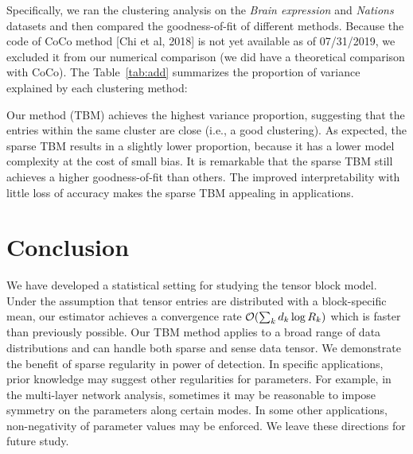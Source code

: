 \documentclass{article}
\begin{document}
Specifically, we ran the clustering analysis on the \emph{Brain expression} and \emph{Nations} datasets and then compared the goodness-of-fit of different methods. Because the code of CoCo method [Chi et al, 2018] is not yet available as of 07/31/2019, we excluded it from our numerical comparison (we did have a theoretical comparison with CoCo). The Table~\ref{tab:add} summarizes the proportion of variance explained by each clustering method:

\begin{table}[h!]
\centering
\caption{Comparison of goodness-of-fit in the \emph{Brain} expression and \emph{Nations} datasets.}\label{tab:add}
\end{table}
\vspace{-.3cm}

Our method (TBM) achieves the highest variance proportion, suggesting that the entries within the same cluster are close (i.e., a good clustering). As expected, the sparse TBM results in a slightly lower proportion, because it has a lower model complexity at the cost of small bias. It is remarkable that the sparse TBM still achieves a higher goodness-of-fit than others. The improved interpretability with little loss of accuracy makes the sparse TBM appealing in applications. 


\vspace{-.05cm}
\section{Conclusion}
\vspace{-.05cm}
We have developed a statistical setting for studying the tensor block model. Under the assumption that tensor entries are distributed with a block-specific mean, our estimator achieves a convergence rate $\mathcal{O}( \sum_kd_k\log R_k)$ which is faster than previously possible. Our TBM method applies to a broad range of data distributions and can handle both sparse and sense data tensor. We demonstrate the benefit of sparse regularity in power of detection. In specific applications, prior knowledge may suggest other regularities for parameters. For example, in the multi-layer network analysis, sometimes it may be reasonable to impose symmetry on the parameters along certain modes. In some other applications, non-negativity of parameter values may be enforced. We leave these directions for future study. 




\end{document}
